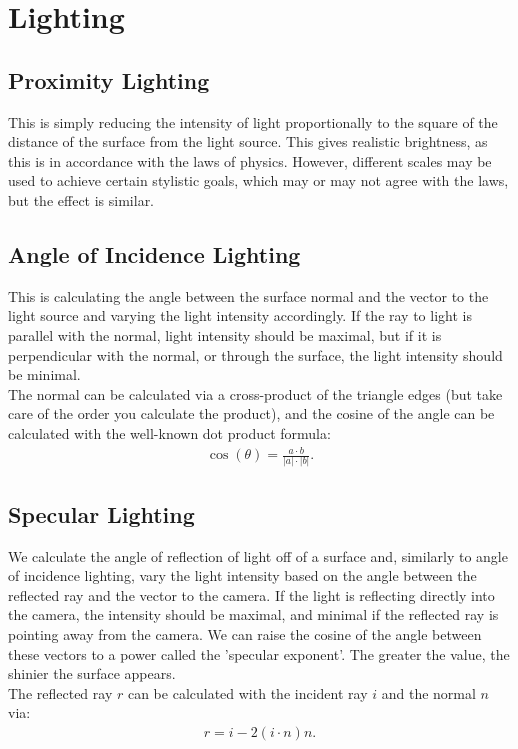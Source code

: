 \section{Lighting}

\subsection{Proximity Lighting}

This is simply reducing the intensity of light proportionally to the
square of the distance of the surface from the light source. This gives
realistic brightness, as this is in accordance with the laws of physics.
However, different scales may be used to achieve certain stylistic goals,
which may or may not agree with the laws, but the effect is similar.

\subsection{Angle of Incidence Lighting}

This is calculating the angle between the surface normal and the vector
to the light source and varying the light intensity accordingly. If the ray
to light is parallel with the normal, light intensity should be maximal, but
if it is perpendicular with the normal, or through the surface, the
light intensity should be minimal.
\\[\baselineskip]
The normal can be calculated via a cross-product of the triangle edges
(but take care of the order you calculate the product), and
the cosine of the angle can be calculated with the well-known dot product
formula: \begin{align*}
    \cos(\theta) = \frac{a \cdot b}{|a| \cdot |b|}.
\end{align*}

\subsection{Specular Lighting}

We calculate the angle of reflection of light off of a surface and, similarly
to angle of incidence lighting, vary the light intensity based on the angle
between the reflected ray and the vector to the camera. If the light is reflecting
directly into the camera, the intensity should be maximal, and minimal if the
reflected ray is pointing away from the camera. We can raise the cosine of the
angle between these vectors to a power called the 'specular exponent'. The greater
the value, the shinier the surface appears.
\\[\baselineskip]
The reflected ray $r$ can be calculated with the incident ray $i$ and the
normal $n$ via: \begin{align*}
    r = i - 2(i \cdot n)n.
\end{align*}

